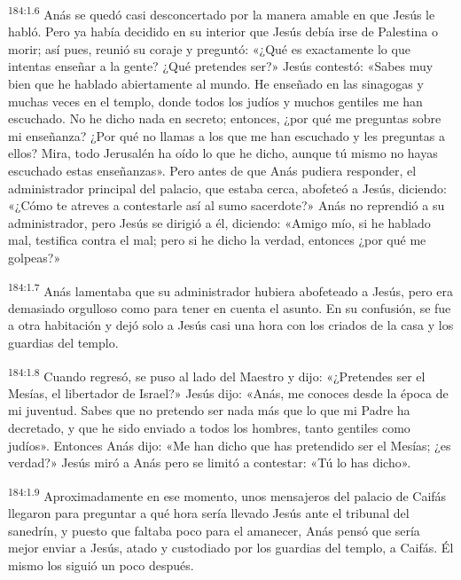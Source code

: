 \par 
\textsuperscript{184:1.6} Anás se quedó casi desconcertado por la manera amable en que Jesús le habló. Pero ya había decidido en su interior que Jesús debía irse de Palestina o morir; así pues, reunió su coraje y preguntó: «¿Qué es exactamente lo que intentas enseñar a la gente? ¿Qué pretendes ser?» Jesús contestó: «Sabes muy bien que he hablado abiertamente al mundo. He enseñado en las sinagogas y muchas veces en el templo, donde todos los judíos y muchos gentiles me han escuchado. No he dicho nada en secreto; entonces, ¿por qué me preguntas sobre mi enseñanza? ¿Por qué no llamas a los que me han escuchado y les preguntas a ellos? Mira, todo Jerusalén ha oído lo que he dicho, aunque tú mismo no hayas escuchado estas enseñanzas». Pero antes de que Anás pudiera responder, el administrador principal del palacio, que estaba cerca, abofeteó a Jesús, diciendo: «¿Cómo te atreves a contestarle así al sumo sacerdote?» Anás no reprendió a su administrador, pero Jesús se dirigió a él, diciendo: «Amigo mío, si he hablado mal, testifica contra el mal; pero si he dicho la verdad, entonces ¿por qué me golpeas?»

\par 
\textsuperscript{184:1.7} Anás lamentaba que su administrador hubiera abofeteado a Jesús, pero era demasiado orgulloso como para tener en cuenta el asunto. En su confusión, se fue a otra habitación y dejó solo a Jesús casi una hora con los criados de la casa y los guardias del templo.

\par 
\textsuperscript{184:1.8} Cuando regresó, se puso al lado del Maestro y dijo: «¿Pretendes ser el Mesías, el libertador de Israel?» Jesús dijo: «Anás, me conoces desde la época de mi juventud. Sabes que no pretendo ser nada más que lo que mi Padre ha decretado, y que he sido enviado a todos los hombres, tanto gentiles como judíos». Entonces Anás dijo: «Me han dicho que has pretendido ser el Mesías; ¿es verdad?» Jesús miró a Anás pero se limitó a contestar: «Tú lo has dicho».

\par 
\textsuperscript{184:1.9} Aproximadamente en ese momento, unos mensajeros del palacio de Caifás llegaron para preguntar a qué hora sería llevado Jesús ante el tribunal del sanedrín, y puesto que faltaba poco para el amanecer, Anás pensó que sería mejor enviar a Jesús, atado y custodiado por los guardias del templo, a Caifás. Él mismo los siguió un poco después.

